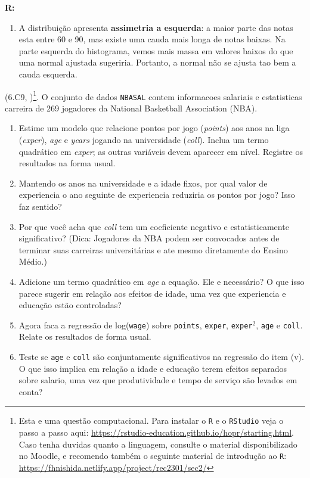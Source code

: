 \documentclass[12pt,letterpaper, onecolumn]{exam}
\renewenvironment{solution}
{\par\noindent\textbf{R:}\enspace\color{blue}}
{\par\color{black}}
\begin{document}
\begin{questions}
\begin{solution}
\begin{enumerate}[label=(\roman*)]
    \item A distribuição apresenta \textbf{assimetria a esquerda}: a maior parte das notas esta entre 60 e 90, mas existe uma cauda mais longa de notas baixas. Na parte esquerda do histograma, vemos mais massa em valores baixos do que uma normal ajustada sugeriria. Portanto, a normal não se ajusta tao bem a cauda esquerda.
\end{enumerate}
\end{solution}

\question\qstar (6.C9, \citep{wooldridge2016})\footnote{Esta e uma questão computacional. Para instalar o \texttt{R} e o \texttt{RStudio} veja o passo a passo aqui: \href{https://rstudio-education.github.io/hopr/starting.html}{https://rstudio-education.github.io/hopr/starting.html}. Caso tenha duvidas quanto a linguagem, consulte o material disponibilizado no Moodle, e recomendo também o seguinte material de introdução ao \texttt{R}: \href{https://fhnishida.netlify.app/project/rec2301/sec2/}{https://fhnishida.netlify.app/project/rec2301/sec2/} }. O conjunto de dados \texttt{NBASAL} contem informacoes salariais e estatisticas carreira de 269 jogadores da National Basketball Association (NBA).

\begin{enumerate}[label=(\roman*)]
    \item Estime um modelo que relacione pontos por jogo (\textit{points}) aos anos na liga (\textit{exper}), \textit{age} e \textit{years} jogando na universidade (\textit{coll}). Inclua um termo quadrático em \textit{exper}; as outras variáveis devem aparecer em nível. Registre os resultados na forma usual.

    \item Mantendo os anos na universidade e a idade fixos, por qual valor de experiencia o ano seguinte de experiencia reduziria os pontos por jogo? Isso faz sentido?

    \item Por que você acha que \textit{coll} tem um coeficiente negativo e estatisticamente significativo? (Dica: Jogadores da NBA podem ser convocados antes de terminar suas carreiras universitárias e ate mesmo diretamente do Ensino Médio.)

    \item Adicione um termo quadrático em \textit{age} a equação. Ele e necessário? O que isso parece sugerir em relação aos efeitos de idade, uma vez que experiencia e educação estão controladas?

    \item Agora faca a regressão de log(\texttt{wage}) sobre \texttt{points}, \texttt{exper}, \texttt{exper$^2$}, \texttt{age} e \texttt{coll}. Relate os resultados de forma usual.

    \item Teste se \texttt{age} e \texttt{coll} são conjuntamente significativos na regressão do item (v). O que isso implica em relação a idade e educação terem efeitos separados sobre salario, uma vez que produtividade e tempo de serviço são levados em conta?
\end{enumerate}

\end{questions}


\end{document}
